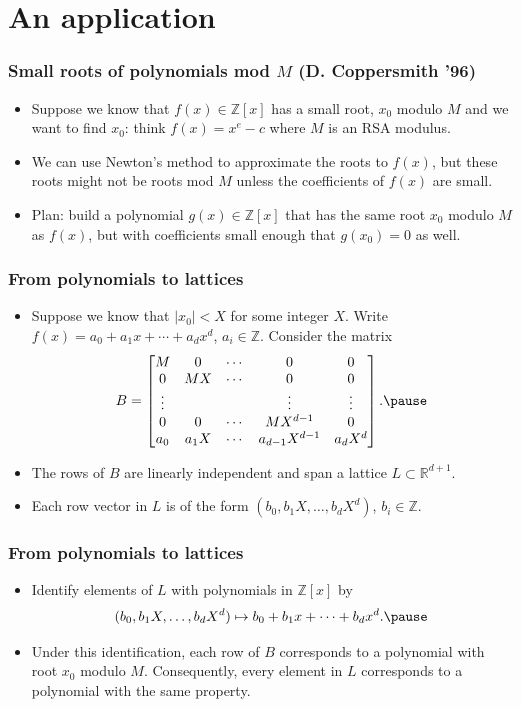 \documentclass{beamer}
\newcommand{\integers}{\mathbb{Z}}
\newcommand{\reals}{\mathbb{R}}
\begin{document}
\section{An application}
\begin{frame}
	\frametitle{Small roots of polynomials mod $M$ (D. Coppersmith '96)}
	\begin{itemize}
		\item Suppose we know that $f(x)\in \integers[x]$ has a small root, $x_0$ modulo $M$ and we want to find $x_0$: think $f(x) = x^e-c$ where $M$ is an RSA modulus.\pause
		\item We can use Newton's method to approximate the roots to $f(x)$, but these roots might not be roots mod $M$ unless the coefficients of $f(x)$ are small.\pause
		\item Plan: build a polynomial $g(x)\in \integers[x]$ that has the same root $x_0$ modulo $M$ as $f(x)$, but with coefficients small enough that $g(x_0) = 0$ as well.
	\end{itemize}
\end{frame}

\begin{frame}
	\frametitle{From polynomials to lattices}
	\begin{itemize}
		\item Suppose we know that $|x_0|<X$ for some integer $X$. Write $f(x) = a_0 + a_1x + \cdots + a_dx^d$, $a_i \in \integers$. Consider the matrix
		\[
			B = \begin{bmatrix}
			M & 0 & \cdots & 0 & 0\\
			0 & MX & \cdots & 0 & 0\\
			\vdots &  && \vdots & \vdots\\
			0 & 0 & \cdots & MX^{d-1} & 0\\
			a_0 & a_1X & \cdots & a_{d-1}X^{d-1} & a_dX^d
			\end{bmatrix}.\pause
		\]
		\item The rows of $B$ are linearly independent and span a lattice $L\subset \reals^{d+1}$.\pause
		\item Each row vector in $L$ is of the form $(b_0, b_1X, \ldots, b_dX^d)$, $b_i\in \integers$.
	\end{itemize}
\end{frame}

\begin{frame}
	\frametitle{From polynomials to lattices}
	\begin{itemize}
		\item Identify elements of $L$ with polynomials in $\integers[x]$ by
		\[
		(b_0, b_1X, \ldots, b_dX^d)\mapsto b_0 + b_1x + \cdots + b_dx^d.\pause
		\]
		\item Under this identification, each row of $B$ corresponds to a polynomial with root $x_0$ modulo $M$. Consequently, every element in $L$ corresponds to a polynomial with the same property.
	\end{itemize}
\end{frame}
\end{document}
